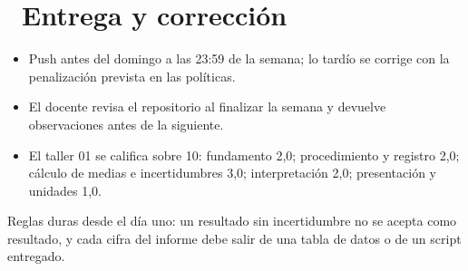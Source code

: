 \documentclass[11pt,a4paper]{article}
\newcommand{\iconotexto}[2]{\textcolor{cyanNeon}{\faIcon{#1}}~#2}
\begin{document}
\section{\iconotexto{upload}{Entrega y corrección}}

\begin{itemize}[leftmargin=1.4em,itemsep=2pt,topsep=3pt]
  \item Push antes del domingo a las 23:59 de la semana; lo tardío se corrige con la penalización prevista en las políticas.
  \item El docente revisa el repositorio al finalizar la semana y devuelve observaciones antes de la siguiente.
  \item El taller 01 se califica sobre 10: fundamento 2,0; procedimiento y registro 2,0; cálculo de medias e incertidumbres 3,0; interpretación 2,0; presentación y unidades 1,0.
\end{itemize}

\begin{cajaReto}Reglas duras desde el día uno: un resultado sin incertidumbre no se acepta como resultado, y cada cifra del informe debe salir de una tabla de datos o de un script entregado.\end{cajaReto}
\end{document}
